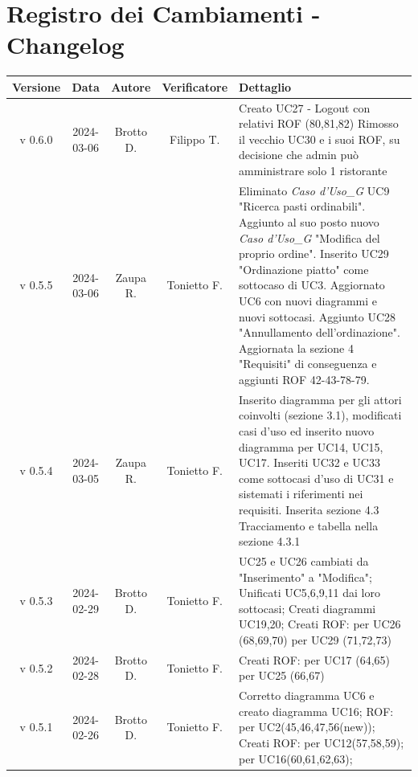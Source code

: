 \documentclass[12pt, oneside]{article}
\begin{document}
\section*{Registro dei Cambiamenti - Changelog}
\begin{longtable}{|c|c|c|c|p{7cm}|}
\hline
\textbf{Versione} & \textbf{Data} & \textbf{Autore} & \textbf{Verificatore} & 
\textbf{Dettaglio} \\
\hline
v 0.6.0 & 2024-03-06 & Brotto D. & Filippo T. & Creato UC27 - Logout con relativi ROF (80,81,82) 
\newline Rimosso il vecchio UC30 e i suoi ROF, su decisione che admin può amministrare solo 1 ristorante
\\
\hline
v 0.5.5 & 2024-03-06 & Zaupa R. & Tonietto F. & Eliminato \textit{Caso d'Uso_G} UC9 "Ricerca pasti ordinabili". Aggiunto al suo posto nuovo \textit{Caso d'Uso_G} "Modifica del proprio ordine". Inserito UC29 "Ordinazione piatto" come sottocaso di UC3. Aggiornato UC6 con nuovi diagrammi e nuovi sottocasi. Aggiunto UC28 "Annullamento dell'ordinazione". Aggiornata la sezione 4 "Requisiti" di conseguenza e aggiunti ROF 42-43-78-79. \\
\hline
v 0.5.4 & 2024-03-05 & Zaupa R. & Tonietto F. & Inserito diagramma per gli attori coinvolti (sezione 3.1), modificati casi d'uso ed inserito nuovo diagramma per UC14, UC15, UC17. Inseriti UC32 e UC33 come sottocasi d'uso di UC31 e sistemati i riferimenti nei requisiti. Inserita sezione 4.3 Tracciamento e tabella nella sezione 4.3.1\\
\hline
v 0.5.3 & 2024-02-29 & Brotto D. & Tonietto F. & UC25 e UC26 cambiati da "Inserimento" a "Modifica";
\newline Unificati UC5,6,9,11 dai loro sottocasi;
\newline Creati diagrammi UC19,20;
\newline Creati ROF:
\newline per UC26 (68,69,70)
\newline per UC29 (71,72,73)
\\
\hline
v 0.5.2 & 2024-02-28 & Brotto D. & Tonietto F. & Creati ROF:
\newline per UC17 (64,65) 
\newline per UC25 (66,67)
\\
\hline
v 0.5.1 & 2024-02-26 & Brotto D. & Tonietto F. & Corretto diagramma UC6 e creato diagramma UC16; \newline ROF: per UC2(45,46,47,56(new)); 
\newline Creati ROF: \newline per UC12(57,58,59); \newline per UC16(60,61,62,63); \\

\end{longtable}
\end{document}
